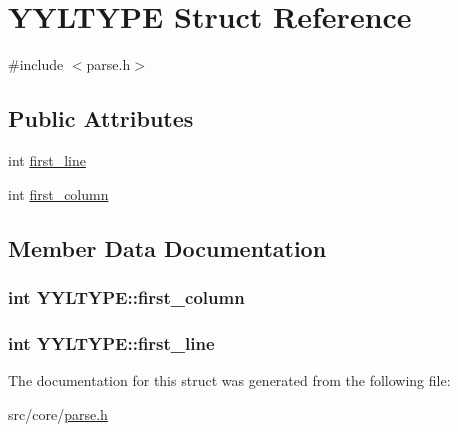 \hypertarget{a00162}{\section{Y\-Y\-L\-T\-Y\-P\-E Struct Reference}
\label{a00162}
}


{\ttfamily \#include $<$parse.\-h$>$}

\subsection*{Public Attributes}
\begin{DoxyCompactItemize}
\item 
int \hyperlink{a00162_a50ad3435eaea74bcab6f1ae5fbaefd89}{first\-\_\-line}
\item 
int \hyperlink{a00162_a3a556533babab1b9066fa9bdbb809210}{first\-\_\-column}
\end{DoxyCompactItemize}


\subsection{Member Data Documentation}
\hypertarget{a00162_a3a556533babab1b9066fa9bdbb809210}{
\subsubsection[{first\-\_\-column}]{\setlength{\rightskip}{0pt plus 5cm}int Y\-Y\-L\-T\-Y\-P\-E\-::first\-\_\-column}}\label{a00162_a3a556533babab1b9066fa9bdbb809210}
\hypertarget{a00162_a50ad3435eaea74bcab6f1ae5fbaefd89}{
\subsubsection[{first\-\_\-line}]{\setlength{\rightskip}{0pt plus 5cm}int Y\-Y\-L\-T\-Y\-P\-E\-::first\-\_\-line}}\label{a00162_a50ad3435eaea74bcab6f1ae5fbaefd89}


The documentation for this struct was generated from the following file\-:\begin{DoxyCompactItemize}
\item 
src/core/\hyperlink{a00221}{parse.\-h}\end{DoxyCompactItemize}
